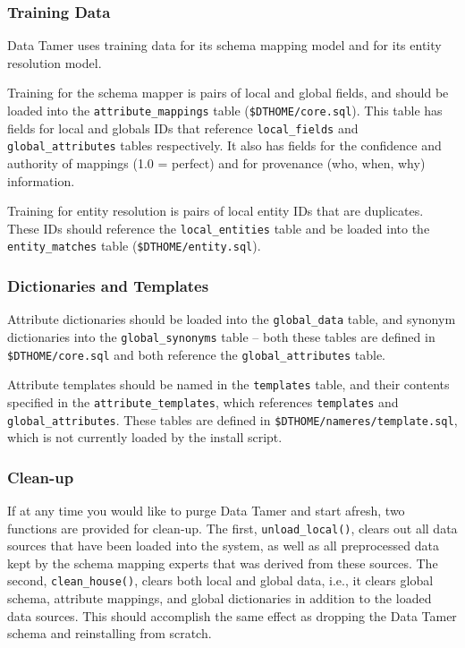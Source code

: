 \subsubsection{Training Data}

Data Tamer uses training data for its schema mapping model and for its entity resolution model.

Training for the schema mapper is pairs of local and global fields, and should be loaded into the \texttt{attribute\_mappings} table (\texttt{\$DTHOME/core.sql}).  This table has fields for local and globals IDs that reference \texttt{local\_fields} and \texttt{global\_attributes} tables respectively.  It also has fields for the confidence and authority of mappings (1.0 = perfect) and for provenance (who, when, why) information.

Training for entity resolution is pairs of local entity IDs that are duplicates.  These IDs should reference the \texttt{local\_entities} table and be loaded into the \texttt{entity\_matches} table (\texttt{\$DTHOME/entity.sql}).

\subsubsection{Dictionaries and Templates}

Attribute dictionaries should be loaded into the \texttt{global\_data} table, and synonym dictionaries into the \texttt{global\_synonyms} table -- both these tables are defined in \texttt{\$DTHOME/core.sql} and both reference the \texttt{global\_attributes} table.

Attribute templates should be named in the \texttt{templates} table, and their contents specified in the \texttt{attribute\_templates}, which references \texttt{templates} and \texttt{global\_attributes}.  These tables are defined in \texttt{\$DTHOME/nameres/template.sql}, which is not currently loaded by the install script.

\subsubsection{Clean-up}

If at any time you would like to purge Data Tamer and start afresh, two functions are provided for clean-up.  The first, \texttt{unload\_local()}, clears out all data sources that have been loaded into the system, as well as all preprocessed data kept by the schema mapping experts that was derived from these sources.  The second, \texttt{clean\_house()}, clears both local and global data, i.e., it clears global schema, attribute mappings, and global dictionaries in addition to the loaded data sources.  This should accomplish the same effect as dropping the Data Tamer schema and reinstalling from scratch.


